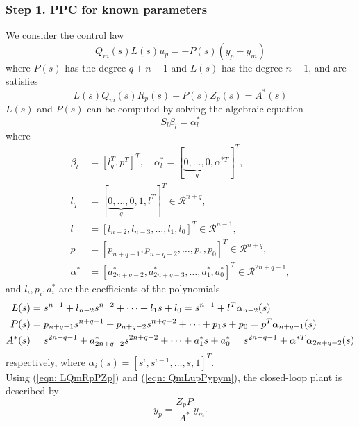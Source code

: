 \documentclass[10pt]{article}
\begin{document}
\begin{multicols*}{2}
\subsubsection{Step 1. PPC for known parameters}
We consider the control law
\begin{equation}
	Q_m(s) L(s) u_p=-P(s)\left(y_p-y_m\right)
	\label{eqn: QmLupPypym}
\end{equation}
where $P(s)$ has the degree $q+n-1$ and $L(s)$ has the degree $n-1$, and are satisfies
\begin{equation}
	L(s) Q_m(s) R_p(s)+P(s) Z_p(s)=A^*(s)
	\label{eqn: LQmRpPZp}
\end{equation}
$L(s)$ and $P(s)$ can be computed by solving the algebraic equation
\begin{equation}
	S_l \beta_l=\alpha_l^*
	\label{eqn: SLbeta}
\end{equation}
where
\begin{equation*}
	\begin{split}
		\beta_l  & =\left[l_q^T, p^T\right]^T, \quad \alpha_l^*=[\underbrace{0, \ldots, 0}_q, \alpha^{* T}]^T,   \\
		l_q      & =[\underbrace{0, \ldots, 0}_q, 1, l^T]^T \in \mathcal{R}^{n+q},                               \\
		l        & =\left[l_{n-2}, l_{n-3}, \ldots, l_1, l_0\right]^T \in \mathcal{R}^{n-1},                     \\
		p        & =\left[p_{n+q-1}, p_{n+q-2}, \ldots, p_1, p_0\right]^T \in \mathcal{R}^{n+q},                 \\
		\alpha^* & =\left[a_{2 n+q-2}^*, a_{2 n+q-3}^*, \ldots, a_1^*, a_0^*\right]^T \in \mathcal{R}^{2 n+q-1},
	\end{split}
\end{equation*}
and $l_i, p_i, a_i^*$ are the coefficients of the polynomials
\begin{equation*}
	\resizebox{1.1\columnwidth}{!}{%
		$\begin{aligned}
				L(s)   & =s^{n-1}+l_{n-2} s^{n-2}+\cdots+l_1 s+l_0=s^{n-1}+l^T \alpha_{n-2}(s)                                    \\
				P(s)   & =p_{n+q-1} s^{n+q-1}+p_{n+q-2} s^{n+q-2}+\cdots+p_1 s+p_0=p^T \alpha_{n+q-1}(s)                          \\
				A^*(s) & =s^{2 n+q-1}+a_{2 n+q-2}^* s^{2 n+q-2}+\cdots+a_1^* s+a_0^*=s^{2 n+q-1}+\alpha^{* T} \alpha_{2 n+q-2}(s)
			\end{aligned}$%
	}
\end{equation*}
respectively, where $\alpha_i(s)=\left[s^i, s^{i-1}, \ldots, s, 1\right]^T$.
\\
Using (\ref{eqn: LQmRpPZp}) and (\ref{eqn: QmLupPypym}), the closed-loop plant is described by
\begin{equation}
	y_p=\frac{Z_p P}{A^*} y_m .
\end{equation}


\end{multicols*}
\end{document}
